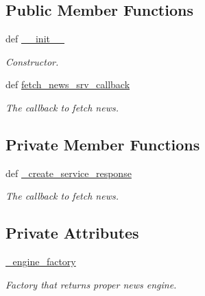 \subsection*{Public Member Functions}
\begin{DoxyCompactItemize}
\item 
def \hyperlink{classrapp__news__explorer_1_1news__explorer__node_1_1NewsExplorerNode_a3d387c71ce302c13012d0e23eb7098c1}{\-\_\-\-\_\-init\-\_\-\-\_\-}
\begin{DoxyCompactList}\small\item\em Constructor. \end{DoxyCompactList}\item 
def \hyperlink{classrapp__news__explorer_1_1news__explorer__node_1_1NewsExplorerNode_aa94290595bb907e20420394881eee8db}{fetch\-\_\-news\-\_\-srv\-\_\-callback}
\begin{DoxyCompactList}\small\item\em The callback to fetch news. \end{DoxyCompactList}\end{DoxyCompactItemize}
\subsection*{Private Member Functions}
\begin{DoxyCompactItemize}
\item 
def \hyperlink{classrapp__news__explorer_1_1news__explorer__node_1_1NewsExplorerNode_a04078f91b90320df603e1dc61642344f}{\-\_\-create\-\_\-service\-\_\-response}
\begin{DoxyCompactList}\small\item\em The callback to fetch news. \end{DoxyCompactList}\end{DoxyCompactItemize}
\subsection*{Private Attributes}
\begin{DoxyCompactItemize}
\item 
\hyperlink{classrapp__news__explorer_1_1news__explorer__node_1_1NewsExplorerNode_ad26828826489d4300018e796b8ee04e6}{\-\_\-engine\-\_\-factory}
\begin{DoxyCompactList}\small\item\em Factory that returns proper news engine. \end{DoxyCompactList}\end{DoxyCompactItemize}


